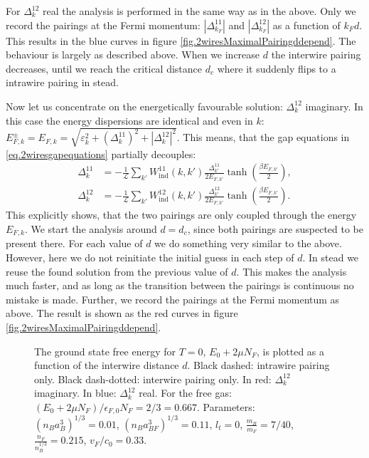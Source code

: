For $\Delta^{12}_k$ real the analysis is performed in the same way as in the above. Only we record the pairings at the Fermi momentum: $\left|\Delta^{11}_{k_F}\right|$ and $\left|\Delta^{12}_{k_F}\right|$ as a function of $k_Fd$. This results in the blue curves in figure \ref{fig.2wiresMaximalPairingddepend}. The behaviour is largely as described above. When we increase $d$ the interwire pairing decreases, until we reach the critical distance $d_c$ where it suddenly flips to a intrawire pairing in stead. 

Now let us concentrate on the energetically favourable solution: $\Delta^{12}_k$ imaginary. In this case the energy dispersions are identical and even in $k$: $E^{\pm}_{F,k} = E_{F,k} = \sqrt{\varepsilon_k^2 + (\Delta^{11}_k)^2 + |\Delta^{12}_k|^2}$. This means, that the gap equations in \eqref{eq.2wiresgapequations} partially decouples: 
\begin{align}
\Delta^{11}_k &= -\frac{1}{\mathcal{L}}\sum_{k'} W_{\text{ind}}^{11}(k, k')\frac{\Delta^{11}_{k'}}{2E_{F,k'}}\tanh\left(\frac{\beta E_{F,k'}}{2}\right), \nonumber \\
\Delta^{12}_k &= -\frac{1}{\mathcal{L}}\sum_{k'} W_{\text{ind}}^{12}(k, k')\frac{\Delta^{12}_{k'}}{2E_{F,k'}}\tanh\left(\frac{\beta E_{F,k'}}{2}\right).
\label{eq.2wiresgapequationsDelta12imaginary}
\end{align} 
This explicitly shows, that the two pairings are only coupled through the energy $E_{F,k}$. We start the analysis around $d = d_c$, since both pairings are suspected to be present there. For each value of $d$ we do something very similar to the above. However, here we do not reinitiate the initial guess in each step of $d$. In stead we reuse the found solution from the previous value of $d$. This makes the analysis much faster, and as long as the transition between the pairings is continuous no mistake is made. Further, we record the pairings at the Fermi momentum as above. The result is shown as the red curves in figure \ref{fig.2wiresMaximalPairingddepend}.

\begin{figure} 
\begin{center}  
  
\caption{The ground state free energy for $T = 0$, $E_0 + 2\mu N_F$, is plotted as a function of the interwire distance $d$. Black dashed: intrawire pairing only. Black dash-dotted: interwire pairing only. In red: $\Delta^{12}_k$ imaginary. In blue: $\Delta^{12}_k$ real. For the free gas: $(E_0 + 2\mu N_F)/\epsilon_{F,0}N_F = 2/3 = 0.667$. Parameters: $(n_Ba_B^3)^{1/3} = 0.01$, $(n_Ba_{BF}^3)^{1/3} = 0.11$, $l_t = 0$, $\frac{m_B}{m_F} = 7/40$, $\frac{n_F}{n_B^{1/3}} = 0.215$, $v_F/c_0 = 0.33$. }  
\label{fig.2wiresE0ddepend}  
\end{center}
\end{figure}

